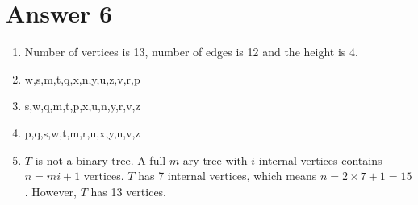 \documentclass[12pt]{article}
\begin{document}
\section*{Answer 6}
\renewcommand{\labelenumi}{\textbf{\alph{enumi}.}}
\begin{enumerate}
    \item Number of vertices is 13, number of edges is 12 and the height is 4.
    \item w,s,m,t,q,x,n,y,u,z,v,r,p
    \item s,w,q,m,t,p,x,u,n,y,r,v,z
    \item p,q,s,w,t,m,r,u,x,y,n,v,z
    \item $T$ is not a binary tree. A full $m$-ary tree with $i$ internal vertices contains $n = mi + 1$ vertices. $T$ has 7 internal vertices, which means $n = 2 \times 7 + 1 = 15$. However, $T$ has 13 vertices.
\end{enumerate}
\end{document}
